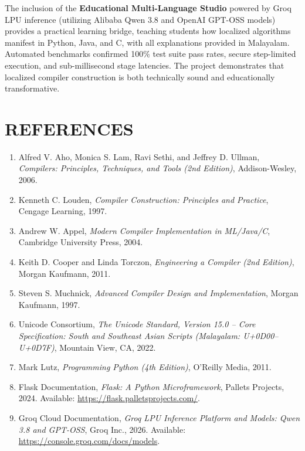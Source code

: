 \documentclass[12pt,a4paper]{report}
\begin{document}
The inclusion of the \textbf{Educational Multi-Language Studio} powered by Groq LPU inference (utilizing Alibaba Qwen 3.8 and OpenAI GPT-OSS models) provides a practical learning bridge, teaching students how localized algorithms manifest in Python, Java, and C, with all explanations provided in Malayalam. Automated benchmarks confirmed 100\% test suite pass rates, secure step-limited execution, and sub-millisecond stage latencies. The project demonstrates that localized compiler construction is both technically sound and educationally transformative.

\newpage
\chapter{REFERENCES}

\begin{enumerate}
    \item Alfred V. Aho, Monica S. Lam, Ravi Sethi, and Jeffrey D. Ullman, \textit{Compilers: Principles, Techniques, and Tools (2nd Edition)}, Addison-Wesley, 2006.
    \item Kenneth C. Louden, \textit{Compiler Construction: Principles and Practice}, Cengage Learning, 1997.
    \item Andrew W. Appel, \textit{Modern Compiler Implementation in ML/Java/C}, Cambridge University Press, 2004.
    \item Keith D. Cooper and Linda Torczon, \textit{Engineering a Compiler (2nd Edition)}, Morgan Kaufmann, 2011.
    \item Steven S. Muchnick, \textit{Advanced Compiler Design and Implementation}, Morgan Kaufmann, 1997.
    \item Unicode Consortium, \textit{The Unicode Standard, Version 15.0 -- Core Specification: South and Southeast Asian Scripts (Malayalam: U+0D00--U+0D7F)}, Mountain View, CA, 2022.
    \item Mark Lutz, \textit{Programming Python (4th Edition)}, O'Reilly Media, 2011.
    \item Flask Documentation, \textit{Flask: A Python Microframework}, Pallets Projects, 2024. Available: \url{https://flask.palletsprojects.com/}.
    \item Groq Cloud Documentation, \textit{Groq LPU Inference Platform and Models: Qwen 3.8 and GPT-OSS}, Groq Inc., 2026. Available: \url{https://console.groq.com/docs/models}.
\end{enumerate}
\end{document}
